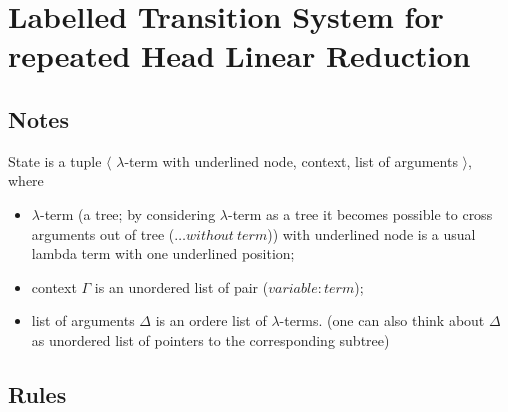 \documentclass[a4paper, 10pt]{article}
\begin{document}
\section{Labelled Transition System for repeated Head Linear Reduction}

\subsection{Notes}
State is a tuple $\langle$ $\lambda$-term with underlined node, context, list of arguments $\rangle$, where
\begin{itemize}
\item $\lambda$-term (a tree; by considering $\lambda$-term as a tree it becomes possible to cross arguments out of tree ($\dots without\ term$)) with underlined node is a usual lambda term with one underlined position;
\item context $\Gamma$ is an unordered list of pair ($variable : term$);
\item list of arguments $\Delta$ is an ordere list of $\lambda$-terms. (one can also think about $\Delta$ as unordered list of pointers to the corresponding subtree)
\end{itemize}


\subsection{Rules}
\end{document}

